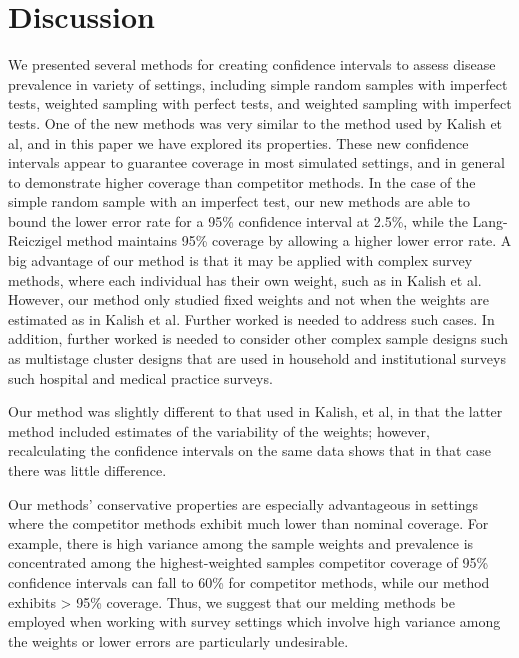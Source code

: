 \documentclass[AMA,STIX1COL]{WileyNJD-v2}
\begin{document}
\pagebreak

\section{Discussion}

We presented several methods for creating confidence intervals to assess disease prevalence in variety of settings, including simple random samples with imperfect tests, weighted sampling with perfect tests, and weighted sampling with imperfect tests.
One of the new methods was very similar to the method used by Kalish et al\cite{Kali:2021}, and in this paper we have explored its properties.
These new confidence intervals appear to guarantee coverage in most simulated settings, and in general to demonstrate higher coverage than competitor methods.
In the case of the simple random sample with an imperfect test, our new methods are able to bound the lower error rate for a 95\% confidence interval at 2.5\%, while the Lang-Reiczigel\cite{Lang:2014} method maintains 95\% coverage by allowing a higher lower error rate.
A big advantage of our method is that it may be applied with complex survey methods, where each individual has their own weight, such as in Kalish et al\cite{Kali:2021}. 
However, our method  only studied fixed weights and not when the weights are estimated as in Kalish et al.  Further worked is needed to address such cases.  In addition, further worked is needed to consider other complex sample designs such as multistage cluster designs that are used in  household and institutional surveys such hospital and medical practice surveys.



Our method was slightly different to that used in Kalish, et al\cite{Kali:2021}, in that the latter method included estimates of the variability of the weights; however, recalculating the confidence intervals on the same data shows that in that case there was little difference. 



Our methods' conservative properties are especially advantageous in settings where the competitor methods exhibit much lower than nominal coverage.
For example, there is high variance among the sample weights and prevalence is concentrated among the highest-weighted samples competitor coverage of 95\% confidence intervals can fall to 60\% for competitor methods, while our method exhibits > 95\% coverage.
Thus, we suggest that our melding methods be employed when working with survey settings which involve high variance among the weights or lower errors are particularly undesirable.
\end{document}
